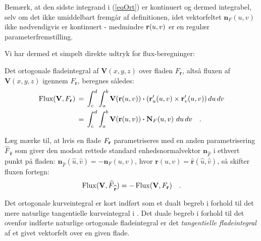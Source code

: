 \begin{think}
Bemærk, at den sidste integrand i (\ref{eqOrt}) er kontinuert
og dermed integrabel, selv om det ikke umiddelbart fremgår af
definitionen,  idet vektorfeltet ${\mathbf{n}}_{F}(u, v)$ ikke
nødvendigvis er kontinuert - medmindre ${\bf r}(u, v)$ er en regulær
parameterfremstilling.
\end{think}

Vi har dermed et simpelt direkte udtryk for flux-beregninger:

\begin{theorem} \label{thmFluxBeregn}
Det ortogonale fladeintegral af $\mathbf{V}(x,y,z)$ over fladen $F_{\mathbf{r}}$, altså fluxen af $\mathbf{V}(x,y,z)$ igennem $F_{\mathbf{r}}$, beregnes således:
\begin{equation}
\begin{aligned}
\operatorname{Flux}({\bf V}, F_{\bf r})\,&= \, \int_{c}^{d}\int_{a}^{b}{\bf V}({\bf r}(u,v)) \bm{\cdot} ({\bf
r}'_{u}(u,v)\times{\bf r}'_{v}(u,v))\,du \, dv  \\
&= \, \int_{c}^{d}\int_{a}^{b}{\bf V}({\bf r}(u,v)) \bm{\cdot} \mathbf{N}_{F}(u,v)\,\,du \, dv  \quad .
\end{aligned}
\end{equation}
\end{theorem}

\begin{aha}
Læg mærke til, at hvis en flade $F_{\bf r}$  parametriseres med en anden parametrisering $\widehat{F}_{\,\widehat{\mathbf{r}}}$ som
giver den modsat rettede standard enhedsnormalvektor $\mathbf{n}_{\widehat{F}}$ i ethvert punkt på fladen:
$\mathbf{n}_{\widehat{F}}(\widehat{u}, \widehat{v}) = -\mathbf{n}_{F}(u,v)$, hvor $\mathbf{r}(u,v) = \widehat{\mathbf{r}}(\widehat{u}, \widehat{v})$,
så skifter fluxen fortegn:
\begin{equation}
\operatorname{Flux}(\mathbf{V}, \widehat{F}_{\,\widehat{\mathbf{r}}}) = - \operatorname{Flux}(\mathbf{V}, F_{\mathbf{r}}) \quad.
\end{equation}
\end{aha}

\begin{think}
Det ortogonale kurveintegral er kort indført som et dualt begreb i forhold til det mere naturlige tangentielle kurveintegral i . Det duale begreb i forhold til det ovenfor indførte naturlige ortogonale fladeintegral er det \emph{tangentielle fladeintegral} af et givet vektorfelt over en given flade.
\end{think}

